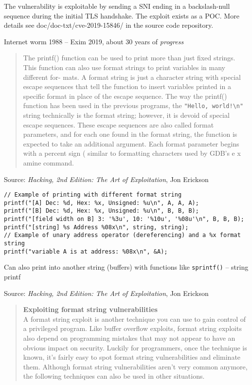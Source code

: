 \documentclass[Screen16to9,17pt]{foils}
\begin{document}
The vulnerability is exploitable by sending a SNI ending in a
backslash-null sequence during the initial TLS handshake. The exploit
exists as a POC. More details see doc/doc-txt/cve-2019-15846/ in the source code repository.


Internet worm 1988 -- Exim 2019, about 30 years of \emph{progress}



\begin{quote}
The printf() function can be used to print more than just fixed strings. This
function can also use format strings to print variables in many different for-
mats. A format string is just a character string with special escape sequences
that tell the function to insert variables printed in a specific format in place
of the escape sequence. The way the printf() function has been used in the
previous programs, the \verb+"Hello, world!\n"+ string technically is the format string;
however, it is devoid of special escape sequences. These escape sequences are
also called format parameters, and for each one found in the format string, the
function is expected to take an additional argument. Each format parameter
begins with a percent sign ( %
similar to formatting characters used by GDB’s e x amine command.
\end{quote}

Source: \emph{Hacking, 2nd Edition: The Art of Exploitation}, Jon Erickson


\begin{verbatim}
// Example of printing with different format string
printf("[A] Dec: %d, Hex: %x, Unsigned: %u\n", A, A, A);
printf("[B] Dec: %d, Hex: %x, Unsigned: %u\n", B, B, B);
printf("[field width on B] 3: '%3u', 10: '%10u', '%08u'\n", B, B, B);
printf("[string] %s Address %08x\n", string, string);
// Example of unary address operator (dereferencing) and a %x format string
printf("variable A is at address: %08x\n", &A);
\end{verbatim}

Can also print into another string (buffers) with functions like \verb+sprintf()+ -- string printf

Source: \emph{Hacking, 2nd Edition: The Art of Exploitation}, Jon Erickson


\begin{quote}
{\bf Exploiting format string vulnerabilities}\\

A format string exploit is another technique you can use to gain control of
a privileged program. Like buffer overflow exploits, format string exploits also
depend on programming mistakes that may not appear to have an obvious
impact on security. Luckily for programmers, once the technique is known,
it’s fairly easy to spot format string vulnerabilities and eliminate them.
Although format string vulnerabilities aren’t very common anymore, the
following techniques can also be used in other situations.
\end{quote}
\end{document}
